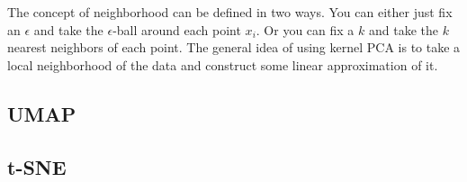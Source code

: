     The concept of neighborhood can be defined in two ways. You can either just fix an $\epsilon$ and take the $\epsilon$-ball around each point $x_i$. Or you can fix a $k$ and take the $k$ nearest neighbors of each point. The general idea of using kernel PCA is to take a local neighborhood of the data and construct some linear approximation of it. 

  \subsection{UMAP}

  \subsection{t-SNE}

